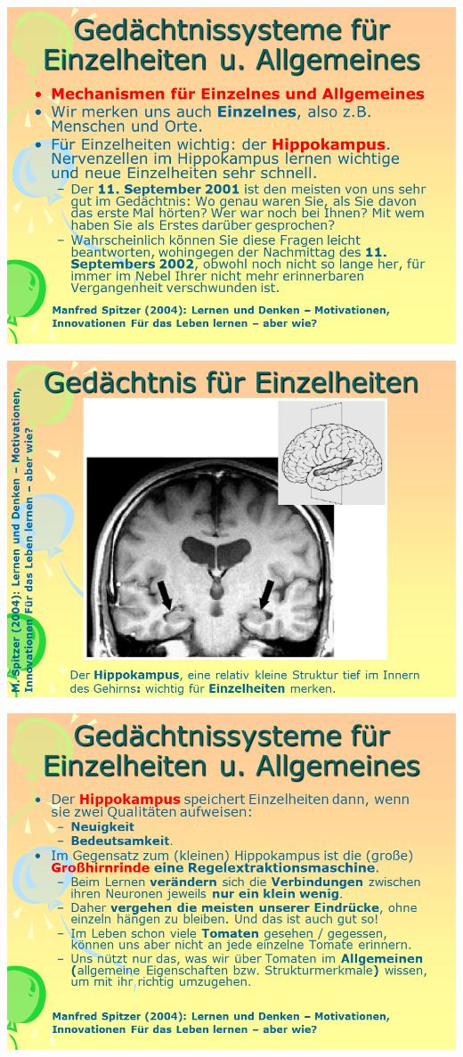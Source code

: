 \documentclass[
  letterpaper,
]{scrbook}
\begin{document}
\includegraphics[width=1\textwidth,height=\textheight]{./pictures/neuro/Diapozitiv53.PNG}

\includegraphics[width=1\textwidth,height=\textheight]{./pictures/neuro/Diapozitiv54.PNG}

\includegraphics[width=1\textwidth,height=\textheight]{./pictures/neuro/Diapozitiv55.PNG}
\end{document}
